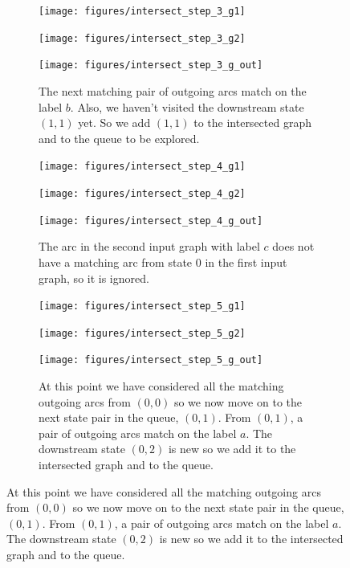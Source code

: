 \begin{figure}
    \begin{subfigure}{\linewidth}
        \begin{minipage}{0.22\textwidth}
            \centering
            \texttt{[image: figures/intersect\_step\_3\_g1]}
        \end{minipage}
        \begin{minipage}{0.37\textwidth}
            \centering
            \texttt{[image: figures/intersect\_step\_3\_g2]}
        \end{minipage}
        \begin{minipage}{0.37\textwidth}
            \centering
            \texttt{[image: figures/intersect\_step\_3\_g\_out]}
        \end{minipage}
        \caption{The next matching pair of outgoing arcs match on the label
        $b$. Also, we haven't visited the downstream state $(1, 1)$ yet. So we
        add $(1, 1)$ to the intersected graph and to the queue to be explored.}
    \end{subfigure}

    \begin{subfigure}{\linewidth}
        \begin{minipage}{0.22\textwidth}
            \centering
            \texttt{[image: figures/intersect\_step\_4\_g1]}
        \end{minipage}
        \begin{minipage}{0.37\textwidth}
            \centering
            \texttt{[image: figures/intersect\_step\_4\_g2]}
        \end{minipage}
        \begin{minipage}{0.37\textwidth}
            \centering
            \texttt{[image: figures/intersect\_step\_4\_g\_out]}
        \end{minipage}
        \caption{The arc in the second input graph with label $c$ does not have
        a matching arc from state $0$ in the first input graph, so it is
        ignored.}
    \end{subfigure}

    \begin{subfigure}{\linewidth}
        \begin{minipage}{0.22\textwidth}
            \centering
            \texttt{[image: figures/intersect\_step\_5\_g1]}
        \end{minipage}
        \begin{minipage}{0.37\textwidth}
            \centering
            \texttt{[image: figures/intersect\_step\_5\_g2]}
        \end{minipage}
        \begin{minipage}{0.37\textwidth}
            \centering
            \texttt{[image: figures/intersect\_step\_5\_g\_out]}
        \end{minipage}
        \caption{At this point we have considered all the matching outgoing
        arcs from $(0, 0)$ so we now move on to the next state pair in the
        queue, $(0, 1)$. From $(0, 1)$, a pair of outgoing arcs match on the
        label $a$. The downstream state $(0, 2)$ is new so we add it to the
        intersected graph and to the queue.}
    \end{subfigure}


\end{figure}

